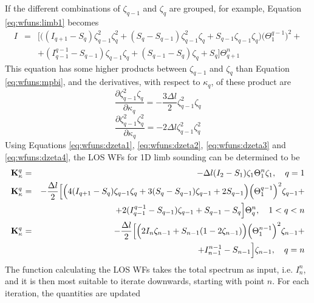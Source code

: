  If the different combinations of $\zeta_{q-1}$ and $\zeta_q$ are 
 grouped, for example, Equation \ref{eq:wfuns:limb1} becomes
 \begin{eqnarray}
   I & = & \Big[\Big((I_{q+1}-S_q)\zeta_{q-1}^2\zeta_q^2+(S_q-S_{q-1})
            \zeta_{q-1}^2\zeta_q + S_{q-1}\zeta_{q-1}\zeta_q
            \Big)\Big(\Theta^{q-1}_{1}\Big)^2 + \nonumber \\
    &  &     + (I_{q-1}^{q-1}-S_{q-1})\zeta_{q-1}\zeta_q + 
            (S_{q-1}-S_q)\zeta_q + S_q \Big] \Theta^n_{q+1} 
 \end{eqnarray}
 This equation has some higher products between
 $\zeta_{q-1}$ and $\zeta_q$ than Equation \ref{eq:wfuns:mpbi}, and
 the derivatives, with respect to $\kappa_q$, of these product are
 \begin{equation}
   \frac{\partial \zeta_{q-1}^2\zeta_q}{\partial \kappa_q} = 
         -\frac{3\Delta l}{2} \zeta_{q-1}^2\zeta_q
  \label{eq:wfuns:dzeta3}
 \end{equation}
 \begin{equation}
   \frac{\partial \zeta_{q-1}^2\zeta_q^2}{\partial \kappa_q} = 
          -2\Delta l \zeta_{q-1}^2\zeta_q^2
  \label{eq:wfuns:dzeta4}
 \end{equation}
 Using Equations \ref{eq:wfuns:dzeta1}, \ref{eq:wfuns:dzeta2},
 \ref{eq:wfuns:dzeta3} and \ref{eq:wfuns:dzeta4}, the LOS WFs for 1D
 limb sounding can be determined to be
 \begin{eqnarray}
   \mathbf{K}_{\kappa}^q& = & -\Delta l (I_2-S_1)\zeta_1\Theta^n_{1}\zeta_1, 
          \quad q=1 \nonumber \\
   \mathbf{K}_{\kappa}^q& = & -\frac{\Delta l}{2}\Big[\Big(4(I_{q+1}-S_q)
           \zeta_{q-1}\zeta_q+
            3(S_q-S_{q-1})\zeta_{q-1} + 2 S_{q-1}
            \Big) \Big(\Theta^{q-1}_{1}\Big)^2\zeta_{q-1} +  \nonumber \\
       &  & + 2(I_{q-1}^{q-1}-S_{q-1})\zeta_{q-1} + 
            S_{q-1}-S_q \Big] \Theta^n_{q}, \quad 1<q<n
  \label{eq:wfuns:loswfs2} \\
   \mathbf{K}_{\kappa}^q& = & -\frac{\Delta l}{2}\Big[\Big( 2I_n\zeta_{n-1}+
         S_{n-1}(1-2\zeta_{n-1}) \Big)\Big(\Theta^{n-1}_{1}\Big)^2\zeta_{n-1}+ 
             \nonumber \\   
       & &  + I_{n-1}^{n-1}-S_{n-1}\Big] \zeta_{n-1}, \quad q=n \nonumber
 \end{eqnarray}
 The function calculating the LOS WFs takes the total spectrum as input,
 i.e. $I_n^n$, and it is then most suitable to iterate downwards,
 starting with point $n$. For each iteration, the quantities are updated
